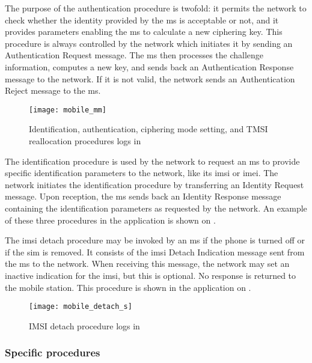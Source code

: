     The purpose of the authentication procedure is twofold: it permits
    the network to check whether the identity provided by the \gls{ms}
    is acceptable or not, and it provides parameters enabling the
    \gls{ms} to calculate a new ciphering key. This procedure is always
    controlled by the network which initiates it by sending an
    Authentication Request message. The \gls{ms} then processes the
    challenge information, computes a new key, and sends back an
    Authentication Response message to the network. If it is not valid,
    the network sends an Authentication Reject message to the \gls{ms}.

      \begin{figure}[p]
        \centering
        \texttt{[image: mobile\_mm]}
        \caption{Identification, authentication, ciphering mode setting, and TMSI
        reallocation procedures logs in }
        \label{fig:mobile_mm}
      \end{figure}

    The identification procedure is used by the network to request an
    \gls{ms} to provide specific identification parameters to the
    network, like its \gls{imsi} or \gls{imei}. The network initiates
    the identification procedure by transferring an Identity Request
    message. Upon reception, the \gls{ms} sends back an Identity
    Response message containing the identification parameters as
    requested by the network. An example of these three procedures in
    the  application is shown on .

    The \gls{imsi} detach procedure may be invoked by an \gls{ms} if the
    phone is turned off or if the \gls{sim} is removed. It consists of
    the \gls{imsi} Detach Indication message sent from the \gls{ms} to
    the network. When receiving this message, the network may set an
    inactive indication for the \gls{imsi}, but this is optional. No
    response is returned to the mobile station. This procedure is shown
    in the  application on .

      \begin{figure}[p]
        \centering
        \texttt{[image: mobile\_detach\_s]}
        \caption{IMSI detach procedure logs in }
        \label{fig:mobile_detach}
      \end{figure}

    \subsubsection{Specific procedures}
    \label{sec:mm_proc_spec}

